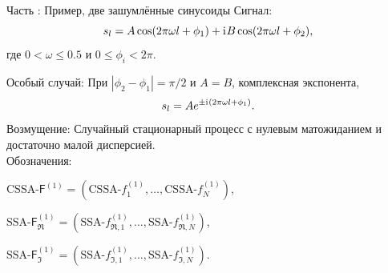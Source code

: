 \documentclass[10pt, ucs, notheorems, handout]{beamer}
\newcommand{\tX}[1]{\mathsf{#1}}
\newcommand{\iu}{\mathrm{i}\mkern1mu}
\newcommand{\RomanNumeralCaps}[1]
{\MakeUppercase{\romannumeral #1}}
\begin{document}
\begin{frame}{Часть \RomanNumeralCaps{2}: Пример, две зашумлённые синусоиды}
\alert{Сигнал:}
\begin{equation*}
\label{eq:general_ts}
s_l = A\cos(2 \pi\omega l + \phi_1) + \iu B\cos(2 \pi\omega l + \phi_2),
\end{equation*}
где $0<\omega\le 0.5$ и $0\le\phi_i < 2\pi$.

\alert{Особый случай:} При $|\phi_2-\phi_1| = \pi/2$ и $A=B$, комплексная экспонента,
$$s_l = Ae^{\pm \iu(2 \pi\omega l + \phi_1)}.$$
\alert{Возмущение:} Случайный стационарный процесс с нулевым матожиданием и достаточно малой дисперсией.\\
\vspace{1em}
\alert{Обозначения:}

$\text{CSSA-}\tX{F}^{(1)} = (\text{CSSA-}f^{(1)}_1, \ldots, \text{CSSA-}f^{(1)}_N)$,

$\text{SSA-}\tX{F}^{(1)}_{\Re} = (\text{SSA-}f^{(1)}_{\Re, 1}, \ldots, \text{SSA-}f^{(1)}_{\Re, N})$,

$\text{SSA-}\tX{F}^{(1)}_{\Im} = (\text{SSA-}f^{(1)}_{\Im, 1}, \ldots, \text{SSA-}f^{(1)}_{\Im, N})$.

\end{frame}
\end{document}
